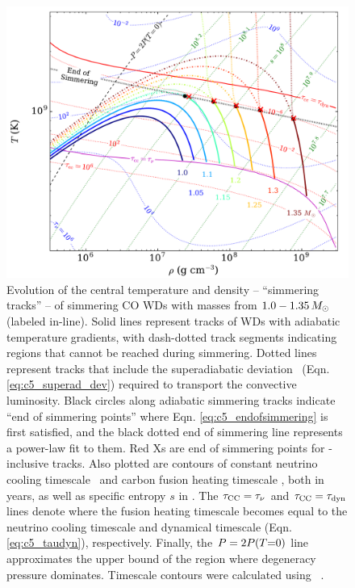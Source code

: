 \begin{figure}
\centering
\includegraphics[angle=0,width=1.0\columnwidth]{chapter5_zhu+16/figures/runaway_rhot.pdf}
\caption{Evolution of the central temperature and density -- ``simmering tracks'' -- of simmering CO WDs with masses from $1.0 - 1.35\,\Msun$ (labeled in-line).  Solid lines represent tracks of WDs with adiabatic temperature gradients, with dash-dotted track segments indicating regions that cannot be reached during simmering.  Dotted lines represent tracks that include the superadiabatic deviation \dnabconv\ (Eqn. \ref{eq:c5_superad_dev}) required to transport the convective luminosity.  Black circles along adiabatic simmering tracks indicate ``end of simmering points'' where Eqn. \ref{eq:c5_endofsimmering} is first satisfied, and the black dotted end of simmering line represents a power-law fit to them.  Red Xs are end of simmering points for \dnabconv-inclusive tracks.  Also plotted are contours of constant neutrino cooling timescale \taunu\ and carbon fusion heating timescale \taucc, both in years, as well as specific entropy $s$ in \ergpKg.  The $\taucc = \taunu$ and $\taucc = \taudyn$ lines denote where the fusion heating timescale becomes equal to the neutrino cooling timescale and dynamical timescale (Eqn. \ref{eq:c5_taudyn}), respectively.  Finally, the $P = 2P(T\mathrm{=}0)$ line approximates the upper bound of the region where degeneracy pressure dominates.  Timescale contours were calculated using \mesa\ \citep{paxt+11}.}
\label{fig:c5_runaway_rhot}
\end{figure}

